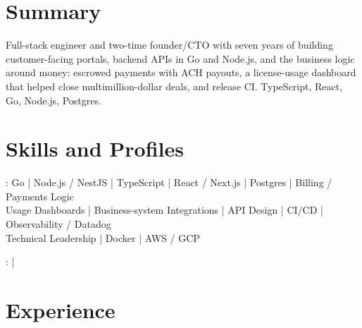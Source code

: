 \documentclass[print]{jack-resume}
\begin{document}
\pagecolor{darkmodeBackground}


\begin{minipage}[t][1cm][t]{.03\textwidth}
    \hfill
\end{minipage}

\section{Summary}
Full-stack engineer and two-time founder/CTO with seven years of building customer-facing portals, backend APIs in Go and Node.js, and the business logic around money: escrowed payments with ACH payouts, a license-usage dashboard that helped close multimillion-dollar deals, and release CI. TypeScript, React, Go, Node.js, Postgres.
\sectionsep

\section{Skills and Profiles}
:
Go \hfill | \hfill
Node.js / NestJS \hfill | \hfill
TypeScript \hfill | \hfill
React / Next.js \hfill | \hfill
Postgres \hfill | \hfill
Billing / Payments Logic \\
\hspace{1.0cm} Usage Dashboards \hfill | \hfill
Business-system Integrations \hfill | \hfill
API Design \hfill | \hfill
CI/CD \hfill | \hfill
Observability / Datadog \\
\hspace{1.0cm} Technical Leadership \hfill | \hfill
Docker \hfill | \hfill
AWS / GCP \\

\raggedright{
    :
      \href{https://www.linkedin.com/in/jack-sturtevant/}{ \ExternalLink} |
     \href{https://github.com/jacksturt}{ \ExternalLink}}

\section{Experience}
\end{document}
